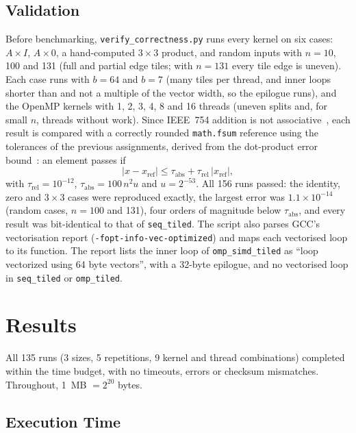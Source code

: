 \documentclass[conference,a4paper]{IEEEtran}
\newcommand{\code}[1]{\texttt{#1}}
\newcommand{\seqk}{\code{seq\_tiled}}
\newcommand{\ompk}{\code{omp\_tiled}}
\newcommand{\simdk}{\code{omp\_simd\_tiled}}
\begin{document}
\subsection{Validation}
Before benchmarking, \code{verify\_correctness.py} runs every kernel on six
cases: $A \times I$, $A \times 0$, a hand-computed $3 \times 3$ product, and
random inputs with $n = 10$, 100 and 131 (full and partial edge tiles; with
$n = 131$ every tile edge is uneven). Each case runs with $b = 64$ and $b = 7$
(many tiles per thread, and inner loops shorter than and not a multiple of the
vector width, so the epilogue runs), and the OpenMP kernels with 1, 2, 3, 4, 8
and 16 threads (uneven splits and, for small $n$, threads without work). Since
IEEE~754 addition is not associative~\cite{ieee754}, each result is compared
with a correctly rounded \code{math.fsum} reference using the tolerances of
the previous assignments, derived from the dot-product error
bound~\cite{higham2002}: an element passes if
\begin{equation}
  |x - x_{\text{ref}}| \le \tau_{\text{abs}} + \tau_{\text{rel}}\, |x_{\text{ref}}|,
\end{equation}
with $\tau_{\text{rel}} = 10^{-12}$, $\tau_{\text{abs}} = 100\, n^2 u$ and
$u = 2^{-53}$. All 156 runs passed: the identity, zero and $3 \times 3$ cases
were reproduced exactly, the largest error was $1.1 \times 10^{-14}$ (random
cases, $n = 100$ and 131), four orders of magnitude below $\tau_{\text{abs}}$,
and every result was bit-identical to that of \seqk. The script also parses
GCC's vectorisation report (\code{-fopt-info-vec-optimized}) and maps each
vectorised loop to its function. The report lists the inner loop of \simdk{}
as ``loop vectorized using 64 byte vectors'', with a 32-byte epilogue, and no
vectorised loop in \seqk{} or \ompk.

\section{Results}
\label{sec:results}

All 135 runs (3 sizes, 5 repetitions, 9 kernel and thread combinations)
completed within the time budget, with no timeouts, errors or checksum
mismatches. Throughout, 1~MB $= 2^{20}$ bytes.

\subsection{Execution Time}
\label{sec:res-time}
\end{document}
